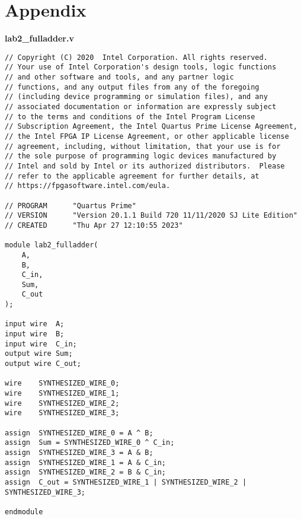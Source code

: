 \documentclass[11pt]{article}
\begin{document}
\section*{\textcolor{mycolor}{Appendix}}

\textbf{lab2\_fulladder.v}
\begin{lstlisting}
// Copyright (C) 2020  Intel Corporation. All rights reserved.
// Your use of Intel Corporation's design tools, logic functions 
// and other software and tools, and any partner logic 
// functions, and any output files from any of the foregoing 
// (including device programming or simulation files), and any 
// associated documentation or information are expressly subject 
// to the terms and conditions of the Intel Program License 
// Subscription Agreement, the Intel Quartus Prime License Agreement,
// the Intel FPGA IP License Agreement, or other applicable license
// agreement, including, without limitation, that your use is for
// the sole purpose of programming logic devices manufactured by
// Intel and sold by Intel or its authorized distributors.  Please
// refer to the applicable agreement for further details, at
// https://fpgasoftware.intel.com/eula.

// PROGRAM		"Quartus Prime"
// VERSION		"Version 20.1.1 Build 720 11/11/2020 SJ Lite Edition"
// CREATED		"Thu Apr 27 12:10:55 2023"

module lab2_fulladder(
	A,
	B,
	C_in,
	Sum,
	C_out
);

input wire	A;
input wire	B;
input wire	C_in;
output wire	Sum;
output wire	C_out;

wire	SYNTHESIZED_WIRE_0;
wire	SYNTHESIZED_WIRE_1;
wire	SYNTHESIZED_WIRE_2;
wire	SYNTHESIZED_WIRE_3;

assign	SYNTHESIZED_WIRE_0 = A ^ B;
assign	Sum = SYNTHESIZED_WIRE_0 ^ C_in;
assign	SYNTHESIZED_WIRE_3 = A & B;
assign	SYNTHESIZED_WIRE_1 = A & C_in;
assign	SYNTHESIZED_WIRE_2 = B & C_in;
assign	C_out = SYNTHESIZED_WIRE_1 | SYNTHESIZED_WIRE_2 | SYNTHESIZED_WIRE_3;

endmodule
\end{lstlisting}
\end{document}
